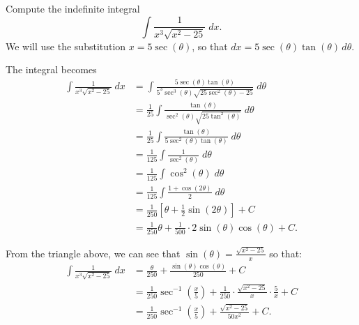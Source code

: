 \documentclass{ximera}
\begin{document}
\begin{example}[example 8]
Compute the indefinite integral
\[
\int \frac{1}{x^3\sqrt{x^2-25}} \; dx.
\]
We will use the substitution $x = 5\sec(\theta)$,
so that $dx = 5\sec(\theta)\tan(\theta) \, d\theta$.

The integral becomes
\begin{align*}
\int \frac{1}{x^3\sqrt{x^2-25}}\; dx &= \int \frac{5\sec(\theta)\tan(\theta)}{5^3\sec^3(\theta)\sqrt{25\sec^2(\theta)-25}}\; d\theta\\[6pt]
                                 &=  \frac{1}{25}\int \frac{\tan(\theta)}{\sec^2(\theta)\sqrt{25\tan^2(\theta)}}\; d\theta\\[6pt]
                                 &=  \frac{1}{25}\int \frac{\tan(\theta)}{5\sec^2(\theta)\tan(\theta)}\; d\theta\\[6pt]
                                  &=  \frac{1}{125} \int \frac{1}{\sec^2(\theta)} \; d\theta\\[6pt]
                                  &= \frac{1}{125} \int \cos^2(\theta)  \; d\theta\\[6pt]
                                  &= \frac{1}{125} \int \frac{1+\cos(2\theta)}{2} \; d\theta\\[6pt]
                                  &= \frac{1}{250}\left[\theta + \frac12 \sin(2\theta)\right] + C\\[6pt]
                                  &= \frac{1}{250} \theta + \frac{1}{500} \cdot 2\sin(\theta)\cos(\theta) + C.
\end{align*}


\begin{image}
\end{image}




From the triangle above, we can see that $\sin(\theta) = \frac{\sqrt{x^2-25}}{x}$ so that:
\begin{align*}
\int \frac{1}{x^3\sqrt{x^2-25}} \; dx &=  \frac{\theta}{250}  + \frac{\sin(\theta)\cos(\theta)}{250} + C \\
&= \frac{1}{250} \sec^{-1}\left(\frac{x}{5}\right) + \frac{1}{250} \cdot \frac{\sqrt{x^2 - 25}}{x}\cdot \frac{5}{x} + C\\
&= \frac{1}{250} \sec^{-1}\left(\frac{x}{5}\right) + \frac{\sqrt{x^2 - 25}}{50x^2}+ C.
\end{align*}

\end{example}
\end{document}
